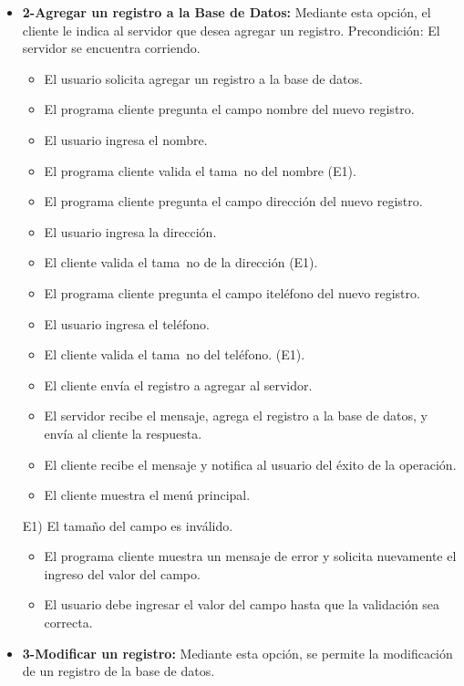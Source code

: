 \documentclass[a4paper,10pt]{article}
\begin{document}
\begin{itemize}
                \item \textbf{2-Agregar un registro a la Base de Datos:} Mediante esta opci\'on, el cliente le indica al servidor que desea agregar un registro. 
                Precondici\'on: El servidor se encuentra corriendo.
                \begin{itemize}
				\item El usuario solicita agregar un registro a la base de datos. 
				\item El programa cliente pregunta el campo nombre del nuevo registro. 
				\item El usuario ingresa el nombre.
				\item El programa cliente valida el tama~no del nombre (E1).
				\item El programa cliente pregunta el campo direcci\'on del nuevo registro. 
				\item El usuario ingresa la direcci\'on.
				\item El cliente valida el tama~no de la direcci\'on (E1).
				\item El programa cliente pregunta el campo itel\'efono del nuevo registro. 
				\item El usuario ingresa el tel\'efono. 
			\item El cliente valida el tama~no del tel\'efono. (E1).
			\item El cliente env\'ia el registro a agregar al servidor.

			\item El servidor recibe el mensaje, agrega el registro a la base de datos, y env\'ia al cliente la respuesta. 
		    \item El cliente recibe el mensaje y notifica al usuario del \'exito de la operaci\'on.
			\item El cliente muestra el men\'u principal.
                \end{itemize}

                E1) El tama\~no del campo es inv\'alido. 
                \begin{itemize}
                    \item El programa cliente muestra un mensaje de error y solicita nuevamente el ingreso del valor del campo. 
			\item El usuario debe ingresar el valor del campo hasta que la validaci\'on sea correcta.
                \end{itemize}
                
                \item \textbf{3-Modificar un registro:} Mediante esta opci\'on, se permite la modificaci\'on de un registro de la base de datos. 
				

\end{itemize}
\end{document}

